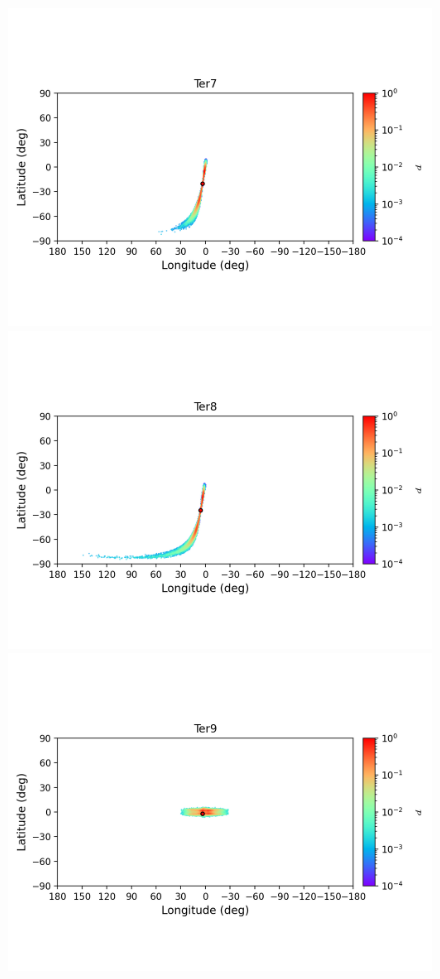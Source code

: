         \begin{figure}
        \includegraphics[clip=true, trim = 0mm 20mm 0mm 10mm, width=1\columnwidth]{images/error_plots_Ter7.png}
        \includegraphics[clip=true, trim = 0mm 20mm 0mm 10mm, width=1\columnwidth]{images/error_plots_Ter8.png}
        \includegraphics[clip=true, trim = 0mm 20mm 0mm 10mm, width=1\columnwidth]{images/error_plots_Ter9.png}

\end{figure}
